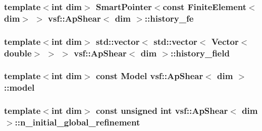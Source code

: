 \hypertarget{classvsf_1_1ApShear_a3c2f9d0e479ed2ebcb3660a3b7b72aee}{
\subsubsection[{history\-\_\-fe}]{\setlength{\rightskip}{0pt plus 5cm}template$<$int dim$>$ Smart\-Pointer$<$const Finite\-Element$<$dim$>$ $>$ {\bf vsf\-::\-Ap\-Shear}$<$ dim $>$\-::history\-\_\-fe\hspace{0.3cm}{\ttfamily [private]}}}\label{classvsf_1_1ApShear_a3c2f9d0e479ed2ebcb3660a3b7b72aee}
\hypertarget{classvsf_1_1ApShear_a7c82ee5522aea1d617636aa1af8b3dd6}{
\subsubsection[{history\-\_\-field}]{\setlength{\rightskip}{0pt plus 5cm}template$<$int dim$>$ std\-::vector$<$ std\-::vector$<$ Vector$<$double$>$ $>$ $>$ {\bf vsf\-::\-Ap\-Shear}$<$ dim $>$\-::history\-\_\-field\hspace{0.3cm}{\ttfamily [private]}}}\label{classvsf_1_1ApShear_a7c82ee5522aea1d617636aa1af8b3dd6}
\hypertarget{classvsf_1_1ApShear_a3a6fb4045df9297aea20326cb0df5748}{
\subsubsection[{model}]{\setlength{\rightskip}{0pt plus 5cm}template$<$int dim$>$ const {\bf Model} {\bf vsf\-::\-Ap\-Shear}$<$ dim $>$\-::model\hspace{0.3cm}{\ttfamily [private]}}}\label{classvsf_1_1ApShear_a3a6fb4045df9297aea20326cb0df5748}
\hypertarget{classvsf_1_1ApShear_ab02322073eb961685e8daef27729bf8d}{
\subsubsection[{n\-\_\-initial\-\_\-global\-\_\-refinement}]{\setlength{\rightskip}{0pt plus 5cm}template$<$int dim$>$ const unsigned int {\bf vsf\-::\-Ap\-Shear}$<$ dim $>$\-::n\-\_\-initial\-\_\-global\-\_\-refinement\hspace{0.3cm}{\ttfamily [private]}}}\label{classvsf_1_1ApShear_ab02322073eb961685e8daef27729bf8d}
